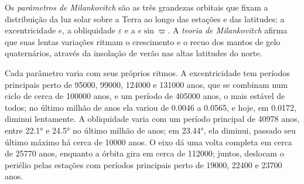 \begin{definition}\label{def:b2:orbital-forcing:milankovitch}
Os \emph{parâmetros de Milankovitch} são as três grandezas
orbitais que fixam a distribuição da luz solar sobre a Terra ao longo das estações e das
latitudes: a excentricidade $e$, a obliquidade $\varepsilon$ e a 
$e\sin\varpi$. A \emph{teoria de Milankovitch} afirma que suas lentas
variações ritmam o crescimento e o recuo dos mantos de gelo quaternários, através da insolação de verão
nas altas latitudes do norte.
\end{definition}

Cada parâmetro varia com seus próprios ritmos. A excentricidade tem períodos principais perto de \num{95000},
\num{99000}, \num{124000} e \num{131000} anos, que se combinam num ciclo de cerca de
\num{100000} anos, e um período de \num{405000} anos, o mais estável de todos; no último
milhão de anos ela variou de \num{0.0046} a \num{0.0565}, e hoje, em \num{0.0172}, diminui
lentamente. A obliquidade varia com um período principal de \num{40978} anos, entre \ang{22.1} e
\ang{24.5} no último milhão de anos; em \ang{23.44}, ela diminui, passado seu último máximo
há cerca de \num{10000} anos. O eixo dá uma volta completa em cerca de \num{25770} anos, enquanto a
órbita gira em cerca de \num{112000}; juntos, deslocam o periélio pelas estações com
períodos principais perto de \num{19000}, \num{22400} e \num{23700} anos.

